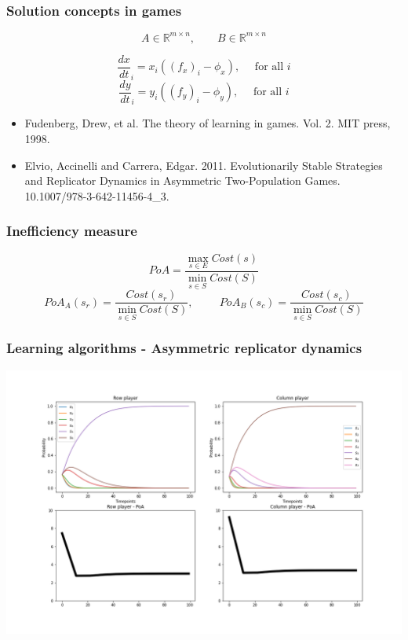 \begin{frame}
    \frametitle{Solution concepts in games}
    \centering
    \[
        A \in \mathbb{R} ^ {m \times n}, \qquad B \in \mathbb{R} ^ {m \times n}   
    \]

    \pause
    \[
        \frac{dx}{dt}_i = x_i((f_x)_i - \phi_x), \quad \text{ for all }i
    \]
    \[
        \frac{dy}{dt}_i = y_i((f_y)_i - \phi_y), \quad \text{ for all }i
    \]
    
    \pause
    \tiny
    \vspace{1cm}
    \begin{itemize}
        \item Fudenberg, Drew, et al. The theory of learning in games. Vol. 2. MIT press, 1998.
        \item Elvio, Accinelli and Carrera, Edgar. 2011. Evolutionarily Stable Strategies and Replicator Dynamics in Asymmetric Two-Population Games. 10.1007/978-3-642-11456-4\_3.
    \end{itemize}

\end{frame}

\begin{frame}
    \frametitle{Inefficiency measure}

    \begin{equation*}
        PoA = \frac{\max_{s \in E} Cost(s)}{\min_{s \in S} Cost(S)}
    \end{equation*}
    \pause
    \footnotesize
    \vspace{1cm}
    \begin{equation*}
        PoA_A(s_r) = \frac{Cost(s_r)}{\min_{s \in S} Cost(S)}, \hspace{1cm} 
        PoA_B(s_c) = \frac{Cost(s_c)}{\min_{s \in S} Cost(S)}
    \end{equation*}

\end{frame}


\begin{frame}
    \frametitle{Learning algorithms - Asymmetric replicator dynamics}

    \includegraphics[scale=0.28]{Bin/ARD_game.png}
    
\end{frame}

